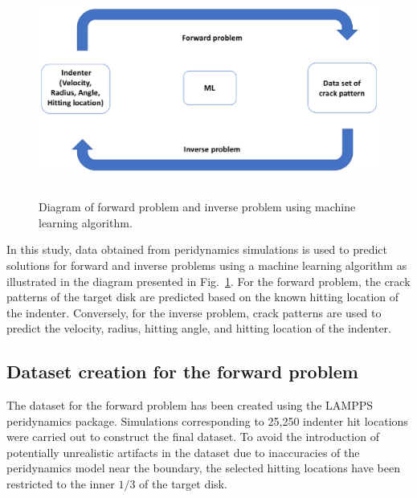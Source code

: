 \begin{figure}
  \includegraphics[width=12cm, height=7cm]{diagram.eps}

\caption{Diagram of forward problem and inverse problem using machine learning algorithm.}
\label{fig:3}       
\end{figure}

In this study, data obtained from peridynamics simulations is used to predict solutions for forward and inverse problems using a machine learning algorithm as illustrated in the diagram presented in Fig.~\ref{fig:3}.
For the forward problem, the crack patterns of the target disk are predicted based on the known hitting location of the indenter.
Conversely, for the inverse problem, crack patterns are used to predict the velocity, radius, hitting angle, and hitting location of the indenter.

\subsection{Dataset creation for the forward problem}
\label{forward_data}

The dataset for the forward problem has been created using the LAMPPS peridynamics package.  Simulations corresponding to  25,250 indenter hit locations were carried out to construct the final dataset.  To avoid the introduction of potentially unrealistic artifacts in the dataset due to inaccuracies of the peridynamics model near the boundary, the selected hitting locations have been restricted to the inner $1/3$ of the target disk.

